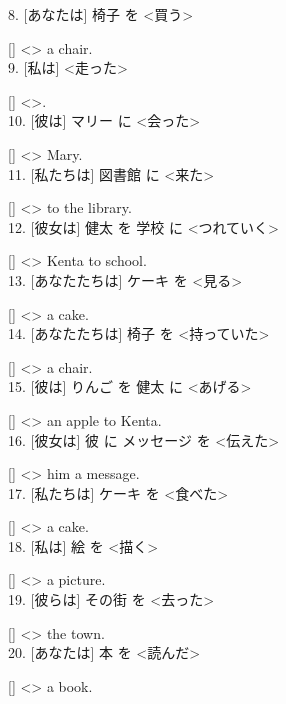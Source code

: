 \documentclass[uplatex,
paper=a4,
fontsize=18pt,
jafontsize=16pt,
number_of_lines=30,
line_length=30zh,
baselineskip=25pt,
]{jlreq}
\begin{document}
8.  [あなたは] 椅子 を <買う>

  [\hspace{3em}] <\hspace{3em}> a chair.
\\

9.  [私は] <走った>

  [\hspace{3em}] <\hspace{3em}>.
\\

10.  [彼は] マリー に <会った>

  [\hspace{3em}] <\hspace{3em}> Mary.
\\

11.  [私たちは] 図書館 に <来た>

  [\hspace{3em}] <\hspace{3em}> to the library.
\\

12.  [彼女は] 健太 を 学校 に <つれていく>

  [\hspace{3em}] <\hspace{3em}> Kenta to school.
\\

13.  [あなたたちは] ケーキ を <見る>

  [\hspace{3em}] <\hspace{3em}> a cake.
\\

14.  [あなたたちは] 椅子 を <持っていた>

  [\hspace{3em}] <\hspace{3em}> a chair.
\\

15.  [彼は] りんご を 健太 に <あげる>

  [\hspace{3em}] <\hspace{3em}> an apple to Kenta.
\\

16.  [彼女は] 彼 に メッセージ を <伝えた>

  [\hspace{3em}] <\hspace{3em}> him a message.
\\

17.  [私たちは] ケーキ を <食べた>

  [\hspace{3em}] <\hspace{3em}> a cake.
\\

18.  [私は] 絵 を <描く>

  [\hspace{3em}] <\hspace{3em}> a picture.
\\

19.  [彼らは] その街 を <去った>

  [\hspace{3em}] <\hspace{3em}> the town.
\\

20.  [あなたは] 本 を <読んだ>

  [\hspace{3em}] <\hspace{3em}> a book.
\\
\end{document}
